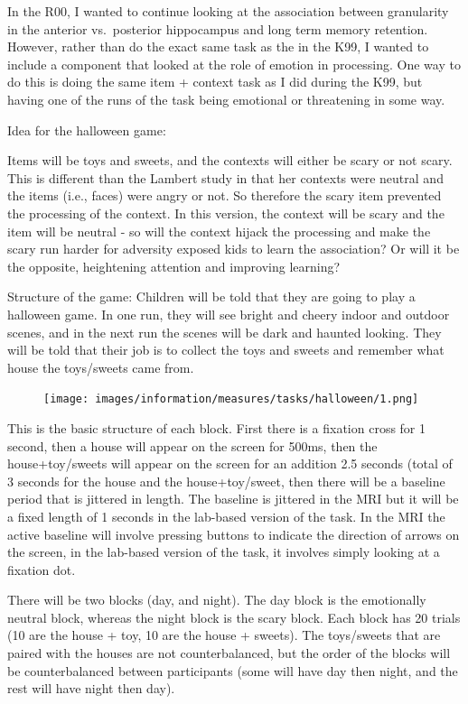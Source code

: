 \documentclass[
]{book}
\begin{document}
In the R00, I wanted to continue looking at the association between granularity in the anterior vs.~posterior hippocampus and long term memory retention. However, rather than do the exact same task as the in the K99, I wanted to include a component that looked at the role of emotion in processing. One way to do this is doing the same item + context task as I did during the K99, but having one of the runs of the task being emotional or threatening in some way.

Idea for the halloween game:

Items will be toys and sweets, and the contexts will either be scary or not scary. This is different than the Lambert study in that her contexts were neutral and the items (i.e., faces) were angry or not. So therefore the scary item prevented the processing of the context. In this version, the context will be scary and the item will be neutral - so will the context hijack the processing and make the scary run harder for adversity exposed kids to learn the association? Or will it be the opposite, heightening attention and improving learning?

Structure of the game:
Children will be told that they are going to play a halloween game. In one run, they will see bright and cheery indoor and outdoor scenes, and in the next run the scenes will be dark and haunted looking. They will be told that their job is to collect the toys and sweets and remember what house the toys/sweets came from.

\begin{figure}
\centering
\texttt{[image: images/information/measures/tasks/halloween/1.png]}
\caption{}
\end{figure}

This is the basic structure of each block. First there is a fixation cross for 1 second, then a house will appear on the screen for 500ms, then the house+toy/sweets will appear on the screen for an addition 2.5 seconds (total of 3 seconds for the house and the house+toy/sweet, then there will be a baseline period that is jittered in length. The baseline is jittered in the MRI but it will be a fixed length of 1 seconds in the lab-based version of the task. In the MRI the active baseline will involve pressing buttons to indicate the direction of arrows on the screen, in the lab-based version of the task, it involves simply looking at a fixation dot.

There will be two blocks (day, and night). The day block is the emotionally neutral block, whereas the night block is the scary block. Each block has 20 trials (10 are the house + toy, 10 are the house + sweets). The toys/sweets that are paired with the houses are not counterbalanced, but the order of the blocks will be counterbalanced between participants (some will have day then night, and the rest will have night then day).
\end{document}

